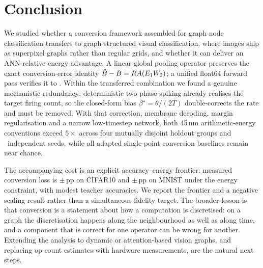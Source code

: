 \section{Conclusion}
\label{sec:conclusion}

We studied whether a conversion framework assembled for graph node classification transfers to graph-structured visual classification, where images ship as superpixel graphs rather than regular grids, and whether it can deliver an ANN-relative energy advantage. A linear global pooling operator preserves the exact conversion-error identity $\hat{B}-B=R A(E_1W_2)$; a unified float64 forward pass verifies it to \IdentityMax. Within the transferred combination we found a genuine mechanistic redundancy: deterministic two-phase spiking already realises the target firing count, so the closed-form bias $\beta^\star=\theta/(2T)$ double-corrects the rate and must be removed. With that correction, membrane decoding, margin regularisation and a narrow low-timestep network, both 45\,nm arithmetic-energy conventions exceed $5\times$ across four mutually disjoint holdout groups and \TotalSeeds\ independent seeds, while all adapted single-point conversion baselines remain near chance.

The accompanying cost is an explicit accuracy--energy frontier: measured conversion loss is \CIFARLoss$\pm$\CIFARLossStd\,pp on CIFAR10 and \MNISTLoss$\pm$\MNISTLossStd\,pp on MNIST under the energy constraint, with modest teacher accuracies. We report the frontier and a negative scaling result rather than a simultaneous fidelity target. The broader lesson is that conversion is a statement about how a computation is discretised: on a graph the discretisation happens along the neighbourhood as well as along time, and a component that is correct for one operator can be wrong for another. Extending the analysis to dynamic or attention-based vision graphs, and replacing op-count estimates with hardware measurements, are the natural next steps.
